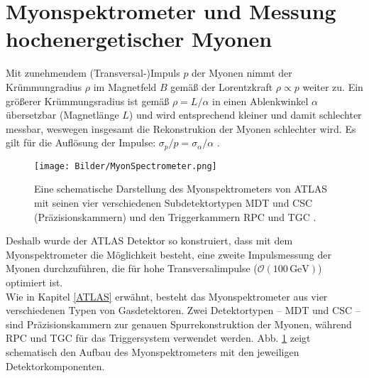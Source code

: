 \section{Myonspektrometer und Messung hochenergetischer Myonen}\label{Myonspec}%
Mit zunehmendem (Transversal-)Impuls $p$ der Myonen nimmt der Krümmungradius $\rho$ im Magnetfeld $B$ gemäß der Lorentzkraft $\rho\propto p$ weiter zu. Ein größerer Krümmungsradius ist gemäß $\rho=L/\alpha$ in einen Ablenkwinkel $\alpha$ übersetzbar (Magnetlänge $L$)  und wird entsprechend kleiner und damit schlechter messbar, weswegen insgesamt die Rekonstrukion der Myonen schlechter wird. Es gilt für die Auflösung der Impulse: $\sigma_p/p=\sigma_{\alpha}/\alpha$ \cite{Halzen}. 
\begin{figure}[htbp]                                 
  \begin{center}                                       
  \texttt{[image: Bilder/MyonSpectrometer.png]} 
   \caption[Schematische Darstellung des Myonspektrometers von ATLAS]{Eine schematische Darstellung des Myonspektrometers von ATLAS mit seinen vier verschiedenen Subdetektortypen MDT und CSC (Präzisionskammern) und den Triggerkammern RPC und TGC \cite{ATLAS}.}
   \label{MyonSpectrometer}                                     
   \end{center}
\end{figure}
Deshalb wurde der ATLAS Detektor so konstruiert, dass mit dem Myonspektrometer die Möglichkeit besteht, eine zweite Impulsmessung der Myonen durchzuführen, die für hohe Transversalimpulse ($\mathcal{O}(100\,\text{GeV})$) optimiert ist.\\
Wie in Kapitel \ref{ATLAS} erwähnt, besteht das Myonspektrometer aus vier verschiedenen Typen von Gasdetektoren. Zwei Detektortypen -- MDT und CSC -- sind Prä\-zisions\-kammern zur genauen Spurrekonstruktion der Myonen, während RPC und TGC für das Triggersystem verwendet werden. Abb. \ref{MyonSpectrometer} zeigt schematisch den Aufbau des Myonspektrometers mit den jeweiligen Detektorkomponenten. 

